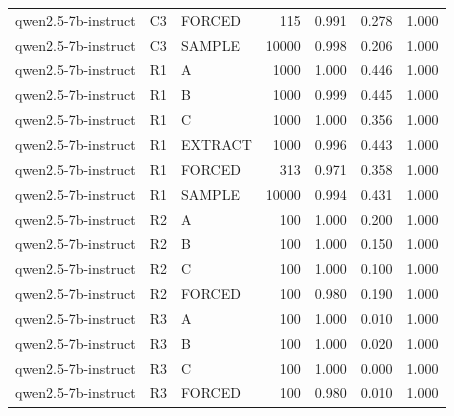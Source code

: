 \begin{table}
\begin{tabular}{lllrrrr}
qwen2.5-7b-instruct & C3 & FORCED & 115 & 0.991 & 0.278 & 1.000 \\
qwen2.5-7b-instruct & C3 & SAMPLE & 10000 & 0.998 & 0.206 & 1.000 \\
qwen2.5-7b-instruct & R1 & A & 1000 & 1.000 & 0.446 & 1.000 \\
qwen2.5-7b-instruct & R1 & B & 1000 & 0.999 & 0.445 & 1.000 \\
qwen2.5-7b-instruct & R1 & C & 1000 & 1.000 & 0.356 & 1.000 \\
qwen2.5-7b-instruct & R1 & EXTRACT & 1000 & 0.996 & 0.443 & 1.000 \\
qwen2.5-7b-instruct & R1 & FORCED & 313 & 0.971 & 0.358 & 1.000 \\
qwen2.5-7b-instruct & R1 & SAMPLE & 10000 & 0.994 & 0.431 & 1.000 \\
qwen2.5-7b-instruct & R2 & A & 100 & 1.000 & 0.200 & 1.000 \\
qwen2.5-7b-instruct & R2 & B & 100 & 1.000 & 0.150 & 1.000 \\
qwen2.5-7b-instruct & R2 & C & 100 & 1.000 & 0.100 & 1.000 \\
qwen2.5-7b-instruct & R2 & FORCED & 100 & 0.980 & 0.190 & 1.000 \\
qwen2.5-7b-instruct & R3 & A & 100 & 1.000 & 0.010 & 1.000 \\
qwen2.5-7b-instruct & R3 & B & 100 & 1.000 & 0.020 & 1.000 \\
qwen2.5-7b-instruct & R3 & C & 100 & 1.000 & 0.000 & 1.000 \\
qwen2.5-7b-instruct & R3 & FORCED & 100 & 0.980 & 0.010 & 1.000 \\
\bottomrule
\end{tabular}
\end{table}
